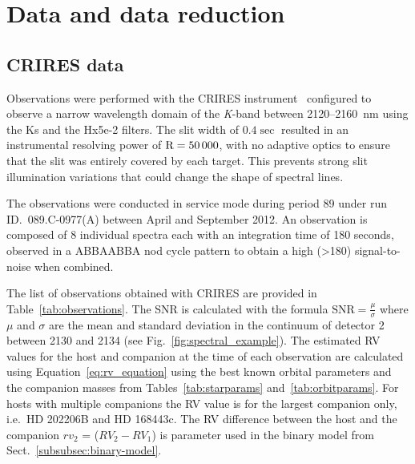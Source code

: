 \documentclass[fleqn,usenatbib]{mnras}
\begin{document}
    
    
    
    
    
    \section{Data and data reduction}
    \label{sec:data}
    
    \subsection{CRIRES data}
    \label{subsec:CRIRES}
    Observations were performed with the CRIRES instrument~\citep{kaeufl_crires_2004} configured to observe a narrow wavelength domain of the \textit{K}-band between 2120--2160~nm using the {Ks} and the {Hx5e-2} filters. The slit width of \(0.4\sec\) resulted in an instrumental resolving power of \(\rm R=50\,000\), with no adaptive optics to ensure that the slit was entirely covered by each target. This prevents strong slit illumination variations that could change the shape of spectral lines.
    
    The observations were conducted in service mode during period 89 under run ID.~089.C-0977(A) between April and September 2012. An observation is composed of 8 individual spectra each with an integration time of 180 seconds, observed in a ABBAABBA nod cycle pattern to obtain a high (>180) signal-to-noise when combined.
    
    {The list of observations obtained with CRIRES are provided in Table~\ref{tab:observations}. The SNR is calculated with the formula \(\textrm{SNR} = \frac{\mu}{\sigma}\) where $\mu$ and $\sigma$ are the mean and standard deviation in the continuum of detector 2 between 2130 and 2134 (see Fig.~\ref{fig:spectral_example}).
    The estimated RV values for the host and companion at the time of each observation are calculated using Equation~\ref{eq:rv_equation} using the best known orbital parameters and the companion masses from Tables~\ref{tab:starparams} and~\ref{tab:orbitparams}. For hosts with multiple companions the RV value is for the largest companion only, i.e.\ {HD 202206}B and {HD 168443}c. The RV difference between the host and the companion \(rv_2\) = (\(RV_2 - RV_1\)) is parameter used in the binary model from Sect.~\ref{subsubsec:binary-model}. }
    
    
    
\end{document}
